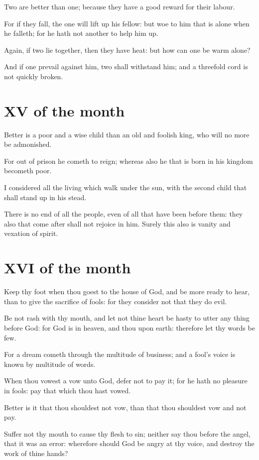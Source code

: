 \documentclass[0main.tex]{subfiles}
\begin{document}
Two are better than one; because they have a good reward for their labour.

For if they fall, the one will lift up his fellow: but woe to him that is alone when he falleth; for he hath not another to help him up.

Again, if two lie together, then they have heat: but how can one be warm alone?

And if one prevail against him, two shall withstand him; and a threefold cord is not quickly broken.

\section*{XV of the month}

Better is a poor and a wise child than an old and foolish king, who will no more be admonished.

For out of prison he cometh to reign; whereas also he that is born in his kingdom becometh poor.

I considered all the living which walk under the sun, with the second child that shall stand up in his stead.

There is no end of all the people, even of all that have been before them: they also that come after shall not rejoice in him. Surely this also is vanity and vexation of spirit.

\section*{XVI of the month}

Keep thy foot when thou goest to the house of God, and be more ready to hear, than to give the sacrifice of fools: for they consider not that they do evil.

Be not rash with thy mouth, and let not thine heart be hasty to utter any thing before God: for God is in heaven, and thou upon earth: therefore let thy words be few.

For a dream cometh through the multitude of business; and a fool's voice is known by multitude of words.

When thou vowest a vow unto God, defer not to pay it; for he hath no pleasure in fools: pay that which thou hast vowed.

Better is it that thou shouldest not vow, than that thou shouldest vow and not pay.

Suffer not thy mouth to cause thy flesh to sin; neither say thou before the angel, that it was an error: wherefore should God be angry at thy voice, and destroy the work of thine hands?
\end{document}
